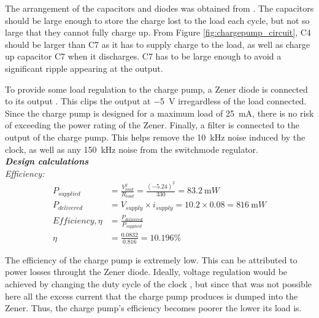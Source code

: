 The arrangement of the capacitors and diodes was obtained from \cite{chargepump-main}. The capacitors should be large enough to store the charge lost to the load each cycle, but not so large that they cannot fully charge up. From Figure \ref{fig:chargepump_circuit}, C4 should be larger than C7 as it has to supply charge to the load, as well as charge up capacitor C7 when it discharges. C7 has to be large enough to avoid a significant ripple appearing at the output. 

To provide some load regulation to the charge pump, a Zener diode is connected to its output \cite{Neamen:Microelectronics}. This clips the output at \SI{-5}{\volt} irregardless of the load connected. Since the charge pump is designed for a maximum load of \SI{25}{\milli\ampere}, there is no risk of exceeding the power rating of the Zener. Finally, a filter is connected to the output of the charge pump. This helps remove the \SI{10}{\kilo Hz} noise induced by the clock, as well as any \SI{150}{\kilo Hz} noise from the switchmode regulator. \\


\noindent\textbf{\textit{Design calculations}} \\
\textit{Efficiency:}
\begin{equation*}
    \begin{split}
        P_{supplied} &= \frac{V_{load}^2}{R_{load}} = \frac{(-5.24)^2}{330} = \SI{83.2}{\milli W} \\
        P_{delivered} &= V_{supply} \times i_{supply} = 10.2 \times 0.08 = \SI{816}{\milli W} \\
        Efficiency, \eta &= \frac{P_{delivered}}{P_{supplied}} \\
        \eta &= \frac{0.0832}{0.816} = 10.196\%
    \end{split}
\end{equation*}

The efficiency of the charge pump is extremely low. This can be attributed to power losses throught the Zener diode. Ideally, voltage regulation would be achieved by changing the duty cycle of the clock \cite{chargepump-power_electronic}, but since that was not possible here all the excess current that the charge pump produces is dumped into the Zener. Thus, the charge pump's efficiency becomes poorer the lower its load is. \\


